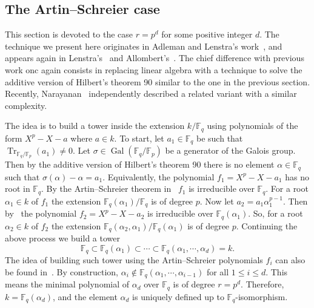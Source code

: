 \documentclass[12pt]{article}
\theoremstyle{plain}
\theoremstyle{definition}
\DeclareMathOperator{\trace}{Tr} %
\DeclareMathOperator{\gal}{Gal} %
\def\F{\ensuremath{\mathbb{F}}}
\begin{document}
\subsection{The Artin--Schreier case}
\label{sec:fast-artin-schreier}

This section is devoted to the case $r = p^d$ for some positive integer $d$.
The technique we present here originates in Adleman and Lenstra's work~\cite[Lemma 5]{Adleman-Lenstra},
and appears again in Lenstra's~\cite{LenstraJr91}
and Allombert's~\cite{Allombert02}.
The chief difference with previous work onc again consists
in replacing linear algebra
with a technique to solve the additive version of Hilbert's theorem 90
similar to the one in the previous section.
Recently, Narayanan~\cite[Sec.~4]{narayanan2016fast} independently described
a related variant with a similar complexity.

The idea is to build a 
tower inside the extension $k/\F_q$ using polynomials of the form $X^p - X - a$ where $a \in k$.
To  start, let $a_1 \in \F_q$ be such that $\trace_{\F_q/\F_p}(a_1) \ne 0$.
Let $\sigma \in  \gal(\F_q/\F_p)$ be a generator of the Galois group.
Then by the additive version of  Hilbert's theorem 90 there is no element 
$\alpha \in \F_q$ such that $\sigma(\alpha) - \alpha = a_1$.
Equivalently, the polynomial $f_1 =  X^p - X - a_1$ has no root in $\F_q$.
By the Artin--Schreier theorem in~\cite[Ch VI]{lang} $f_1$ 
is irreducible over $\F_q$. For a root $\alpha_1 \in k$ of $f_1$ the extension $\F_q(\alpha_1) / \F_q$ is of degree $p$.
Now let $a_2 = a_1\alpha_1^{p - 1}$. Then by~\cite[Lemma 5]{Adleman-Lenstra} the polynomial $f_2 = 
X^p - X - a_2$ is irreducible over $\F_q(\alpha_1)$. So, for a root $\alpha_2 \in k$ of $f_2$ the 
extension $\F_q(\alpha_2, \alpha_1) / \F_q(\alpha_1)$ is of degree $p$. Continuing the above 
process we build a tower
\begin{equation}
	\label{equ:art-sch-tower}
	\F_q \subset \F_q(\alpha_1)  \subset \cdots \subset \F_q(\alpha_1, \cdots, \alpha_d) = k.
\end{equation}
The idea of building such tower using the Artin--Schreier polynomials $f_i$ can also be found
in~\cite{LenstraJr91, Allombert02, shoup93}. By construction, $\alpha_i \notin \F_q(\alpha_1, \cdots, 
\alpha_{i - 1})$ for all $1 \le i \le d$. This means the minimal polynomial of $\alpha_d$ over 
$\F_q$ is of degree $r = p^d$. Therefore, $k = \F_q(\alpha_d)$, and the element $\alpha_d$ is 
uniquely defined up to $\F_q$-isomorphism.
\end{document}
